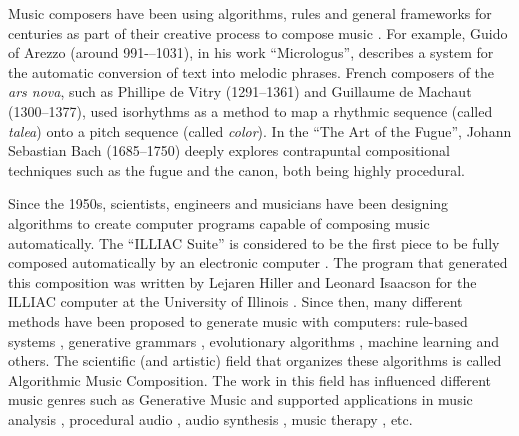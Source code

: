
Music composers have been using algorithms, rules and general frameworks for centuries as part of
their creative process to compose music \cite{nierhaus2009algorithmic}. For example, Guido of Arezzo
(around 991-–1031), in his work ``Micrologus'', describes a system for the automatic conversion of
text into melodic phrases. French composers of the \textit{ars nova}, such as Phillipe de Vitry (1291--1361) and
Guillaume de Machaut (1300--1377), used isorhythms as a method to map a rhythmic sequence
(called \textit{talea}) onto a pitch sequence (called \textit{color}). In the ``The Art of the Fugue'',
Johann Sebastian Bach (1685--1750) deeply explores contrapuntal compositional techniques such as
the fugue and the canon, both being highly procedural.

Since the 1950s, scientists, engineers and musicians have been designing algorithms to create computer
programs capable of composing music automatically. The ``ILLIAC Suite'' is considered to be
the first piece to be fully composed automatically by an electronic computer \cite{nierhaus2009algorithmic}.
The program that generated this composition was written by Lejaren Hiller and Leonard Isaacson
for the ILLIAC computer at the University of Illinois \cite{hiller1957musical}.
Since then, many different methods have been proposed to generate music with computers:
rule-based systems \cite{}, generative grammars \cite{steedman1984generative, roads1979grammars},
evolutionary algorithms \cite{horner1991genetic}, machine learning \cite{hild1992harmonet} and others.
The scientific (and artistic) field that organizes these algorithms is called Algorithmic Music Composition.
The work in this field has influenced different music genres such as Generative Music
\cite{eno1996generative} and supported applications in music analysis
\cite{lerdahl1996generative}, procedural audio \cite{farnell2007introduction},
audio synthesis \cite{engel2017neural}, music therapy \cite{williams2020use}, etc.

